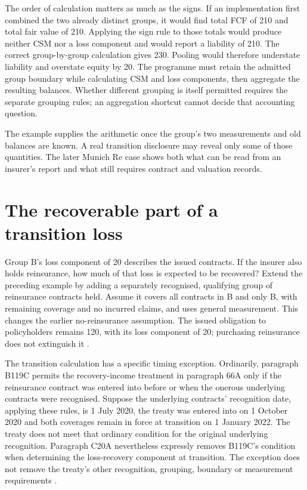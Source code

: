 The order of calculation matters as much as the signs. If an implementation
first combined the two already distinct groups, it would find total FCF of
210 and total fair value of 210. Applying the sign rule to those totals would
produce neither CSM nor a loss component and would report a liability of 210.
The correct group-by-group calculation gives 230. Pooling would therefore
understate liability and overstate equity by 20. The programme must retain
the admitted group boundary while calculating CSM and loss components, then
aggregate the resulting balances. Whether different grouping is itself
permitted requires the separate grouping rules; an aggregation shortcut
cannot decide that accounting question.

The example supplies the arithmetic once the group's two measurements and
old balances are known. A real transition disclosure may reveal only some
of those quantities. The later Munich Re case shows both what can be read from an
insurer's report and what still requires contract and valuation records.

\clearpage
\section{The recoverable part of a transition loss}
\label{sec:reinsurance-transition-recovery}

Group B's loss component of 20 describes the issued contracts. If the insurer
also holds reinsurance, how much of that loss is expected to be recovered?
Extend the preceding example by adding a separately recognised, qualifying
group of reinsurance contracts held. Assume it covers all contracts in B and
only B, with remaining coverage and no incurred claims, and uses general
measurement. This changes the earlier no-reinsurance assumption. The issued
obligation to policyholders remains 120, with its loss component of 20;
purchasing reinsurance does not extinguish it
\citep[paragraphs 60--64 and 75]{aasb17}.

The transition calculation has a specific timing exception. Ordinarily,
paragraph B119C permits the recovery-income treatment in paragraph 66A only
if the reinsurance contract was entered into before or when the onerous
underlying contracts were recognised. Suppose the underlying contracts'
recognition date, applying these rules, is 1 July 2020, the treaty was entered
into on 1 October 2020 and
both coverages remain in force at transition on 1 January 2022. The treaty
does not meet that ordinary condition for the original underlying recognition.
Paragraph C20A nevertheless expressly removes B119C's condition when
determining the loss-recovery component at transition. The exception does
not remove the treaty's other recognition, grouping, boundary or measurement
requirements \citep[paragraphs 61--66B, B119C and C20A]{aasb17}.

